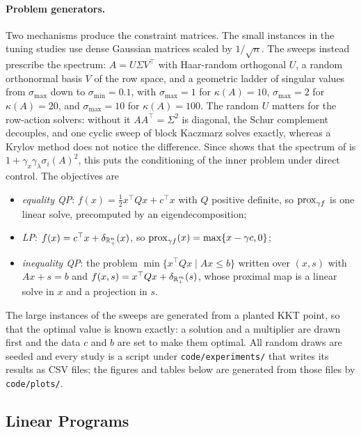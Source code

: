 \documentclass[11pt]{article}
\begin{document}
\paragraph{Problem generators.}
Two mechanisms produce the constraint matrices.
The small instances in the tuning studies use dense Gaussian matrices scaled by $1/\sqrt{n}$.
The sweeps instead prescribe the spectrum: $A = U \Sigma V^\top$ with Haar-random orthogonal $U$, a random orthonormal basis $V$ of the row space, and a geometric ladder of singular values from $\sigma_{\max}$ down to $\sigma_{\min} = 0.1$, with $\sigma_{\max} = 1$ for $\kappa(A) = 10$, $\sigma_{\max} = 2$ for $\kappa(A) = 20$, and $\sigma_{\max} = 10$ for $\kappa(A) = 100$.
The random $U$ matters for the row-action solvers: without it $AA^\top = \Sigma^2$ is diagonal, the Schur complement decouples, and one cyclic sweep of block Kaczmarz solves  exactly, whereas a Krylov method does not notice the difference.
Since  shows that the spectrum of  is $1 + \gamma_x\gamma_\lambda \sigma_i(A)^2$, this puts the conditioning of the inner problem under direct control.
The objectives are
\begin{itemize}
    \item \emph{equality QP}: $f(x) = \frac{1}{2} x^\top Q x + c^\top x$ with $Q$ positive definite, so $\mathrm{prox}_{\gamma f}$ is one linear solve, precomputed by an eigendecomposition;
    \item \emph{LP}: $f(x) = c^\top x + \delta_{\mathbb{R}^n_+}(x)$, so $\mathrm{prox}_{\gamma f}(x) = \max\{x - \gamma c, 0\}$;
    \item \emph{inequality QP}: the problem $\min\{x^\top Q x \mid Ax \leq b\}$ written over $(x, s)$ with $Ax + s = b$ and $f(x, s) = x^\top Q x + \delta_{\mathbb{R}^m_+}(s)$, whose proximal map is a linear solve in $x$ and a projection in $s$.
\end{itemize}
The large instances of the sweeps are generated from a planted KKT point, so that the optimal value is known exactly: a solution and a multiplier are drawn first and the data $c$ and $b$ are set to make them optimal.
All random draws are seeded and every study is a script under \texttt{code/experiments/} that writes its results as CSV files; the figures and tables below are generated from those files by \texttt{code/plots/}.

\subsection{Linear Programs}\label{sec:experiments-lp}
\end{document}
